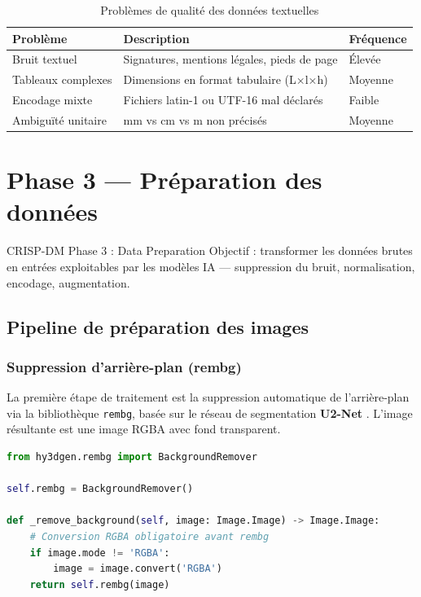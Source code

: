 \documentclass[12pt,a4paper,oneside]{report}
\begin{document}
\begin{table}[H]
\centering
\caption{Problèmes de qualité des données textuelles}
\label{tab:dq}
\begin{tabularx}{\linewidth}{@{}lXl@{}}
\toprule
\textbf{Problème} & \textbf{Description} & \textbf{Fréquence} \\
\midrule
Bruit textuel & Signatures, mentions légales, pieds de page & Élevée \\
Tableaux complexes & Dimensions en format tabulaire (L×l×h) & Moyenne \\
Encodage mixte & Fichiers latin-1 ou UTF-16 mal déclarés & Faible \\
Ambiguïté unitaire & mm vs cm vs m non précisés & Moyenne \\
\bottomrule
\end{tabularx}
\end{table}

\chapter{Phase 3 — Préparation des données}

\begin{crispbox}{CRISP-DM Phase 3 : Data Preparation}
Objectif : transformer les données brutes en entrées exploitables par les
modèles IA — suppression du bruit, normalisation, encodage, augmentation.
\end{crispbox}

\section{Pipeline de préparation des images}

\subsection{Suppression d'arrière-plan (rembg)}
La première étape de traitement est la suppression automatique de
l'arrière-plan via la bibliothèque \texttt{rembg}, basée sur le réseau
de segmentation \textbf{U2-Net} \cite{rembg}. L'image résultante est une
image RGBA avec fond transparent.

\begin{lstlisting}[language=Python,
  caption={Suppression d'arrière-plan dans hunyuan3d\_service.py}]
from hy3dgen.rembg import BackgroundRemover

self.rembg = BackgroundRemover()

def _remove_background(self, image: Image.Image) -> Image.Image:
    # Conversion RGBA obligatoire avant rembg
    if image.mode != 'RGBA':
        image = image.convert('RGBA')
    return self.rembg(image)
\end{lstlisting}
\end{document}
